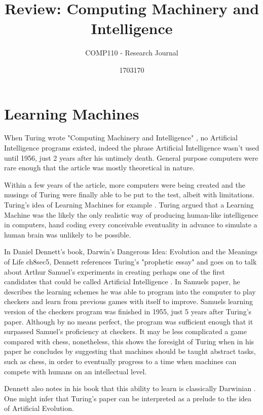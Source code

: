 \documentclass{scrartcl}
\title{Review: Computing Machinery and Intelligence
}
\subtitle{COMP110 - Research Journal}
\author{1703170}
\begin{document}
\maketitle



\section{Learning Machines}


When Turing wrote "Computing Machinery and Intelligence" \cite{turing1950computing:1}, no Artificial Intelligence programs existed, indeed the phrase Artificial Intelligence wasn't used until 1956, just 2 years after his untimely death. General purpose computers were rare enough that the article was mostly theoretical in nature. \par
Within a few years of the article, more computers were being created and the musings of Turing were finally able to be put to the test, albeit with limitations. Turing's idea of Learning Machines for example \cite{ramscar2010computing:2}. Turing argued that a Learning Machine was the likely the only realistic way of producing human-like intelligence in computers, hand coding every conceivable eventuality in advance to simulate a human brain was unlikely to be possible. \par
In Daniel Dennett's book, Darwin's Dangerous Idea: Evolution and the Meanings of Life \cite{dennett1996darwin:3}ch8sec5, Dennett references Turing's "prophetic essay" and goes on to talk about Arthur Samuel's experiments in creating perhaps one of the first candidates that could be called Artificial Intelligence \cite{samuel2000some:4}. In Samuels paper, he describes the learning schemes he was able to program into the computer to play checkers and learn from previous games with itself to improve. Samuels learning version of the checkers program was finished in 1955, just 5 years after Turing's paper. Although by no means perfect, the program was sufficient enough that it surpassed Samuel's proficiency at checkers. It may be less complicated a game compared with chess, nonetheless, this shows the foresight of Turing when in his paper he concludes by suggesting that machines should be taught abstract tasks, such as chess, in order to eventually progress to a time when machines can compete with humans on an intellectual level. \par
Dennett also notes in his book that this ability to learn is classically Darwinian \cite{darwin2009origin:5}. One might infer that Turing's paper can be interpreted as a prelude to the idea of Artificial Evolution.
\end{document}
